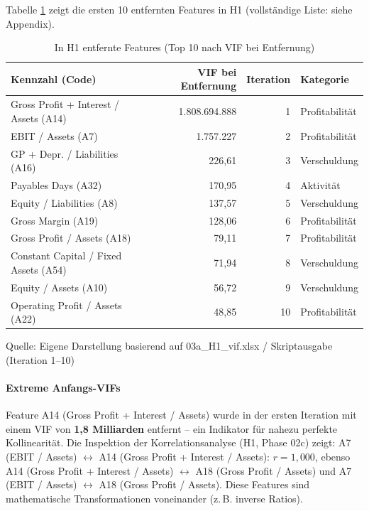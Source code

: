 Tabelle \ref{tab:vif_h1_removed} zeigt die ersten 10 entfernten Features in H1 (vollständige Liste: siehe Appendix).

\begin{table}[htbp]
\centering
\caption{In H1 entfernte Features (Top 10 nach VIF bei Entfernung)}
\label{tab:vif_h1_removed}
\begin{tabular}{lrrl}
\toprule
\textbf{Kennzahl (Code)} & \textbf{VIF bei Entfernung} & \textbf{Iteration} & \textbf{Kategorie} \\
\midrule
Gross Profit + Interest / Assets (A14) & 1.808.694.888 & 1 & Profitabilität \\
EBIT / Assets (A7) & 1.757.227 & 2 & Profitabilität \\
GP + Depr. / Liabilities (A16) & 226,61 & 3 & Verschuldung \\
Payables Days (A32) & 170,95 & 4 & Aktivität \\
Equity / Liabilities (A8) & 137,57 & 5 & Verschuldung \\
Gross Margin (A19) & 128,06 & 6 & Profitabilität \\
Gross Profit / Assets (A18) & 79,11 & 7 & Profitabilität \\
Constant Capital / Fixed Assets (A54) & 71,94 & 8 & Verschuldung \\
Equity / Assets (A10) & 56,72 & 9 & Verschuldung \\
Operating Profit / Assets (A22) & 48,85 & 10 & Profitabilität \\
\bottomrule
\end{tabular}
\par\smallskip
{\footnotesize Quelle: Eigene Darstellung basierend auf 03a\_H1\_vif.xlsx / Skriptausgabe (Iteration 1–10)}
\end{table}

\paragraph{Extreme Anfangs-VIFs} Feature A14 (Gross Profit + Interest / Assets) wurde in der ersten Iteration mit einem VIF von \textbf{1,8 Milliarden} entfernt – ein Indikator für nahezu perfekte Kollinearität. Die Inspektion der Korrelationsanalyse (H1, Phase 02c) zeigt: A7 (EBIT / Assets) $\leftrightarrow$ A14 (Gross Profit + Interest / Assets): $r = 1{,}000$, ebenso A14 (Gross Profit + Interest / Assets) $\leftrightarrow$ A18 (Gross Profit / Assets) und A7 (EBIT / Assets) $\leftrightarrow$ A18 (Gross Profit / Assets). Diese Features sind mathematische Transformationen voneinander (z.\,B. inverse Ratios).


